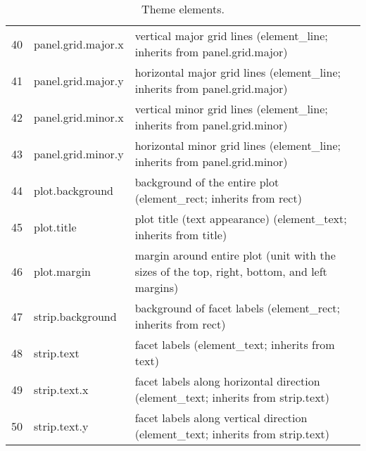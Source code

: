 \begin{table}[ht]
\begin{tabular}{rll}
  40 & panel.grid.major.x & vertical major grid lines (element\_line; inherits from panel.grid.major) \\ 
  41 & panel.grid.major.y & horizontal major grid lines (element\_line; inherits from panel.grid.major) \\ 
  42 & panel.grid.minor.x & vertical minor grid lines (element\_line; inherits from panel.grid.minor) \\ 
  43 & panel.grid.minor.y & horizontal minor grid lines (element\_line; inherits from panel.grid.minor) \\ 
  44 & plot.background & background of the entire plot (element\_rect; inherits from rect) \\ 
  45 & plot.title & plot title (text appearance) (element\_text; inherits from title) \\ 
  46 & plot.margin & margin around entire plot (unit with the sizes of the top, right, bottom, and left margins) \\ 
  47 & strip.background & background of facet labels (element\_rect; inherits from rect) \\ 
  48 & strip.text & facet labels (element\_text; inherits from text) \\ 
  49 & strip.text.x & facet labels along horizontal direction (element\_text; inherits from strip.text) \\ 
  50 & strip.text.y & facet labels along vertical direction (element\_text; inherits from strip.text) \\ 
   \hline
\end{tabular}
\caption{Theme elements.} 
\label{elements}
\end{table}
